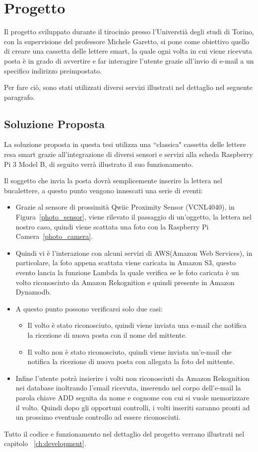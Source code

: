 \chapter{Progetto}
\label{ch:job_motivation}
Il progetto sviluppato durante il tirocinio presso l'Universtià degli studi di Torino, con la supervisione del professore Michele Garetto, si pone come obiettivo 
quello di creare una cassetta delle lettere smart, la quale ogni volta in cui viene ricevuta posta è in grado di avvertire e far interagire l'utente 
grazie all'invio di e-mail a un specifico indirizzo preimpostato.

Per fare ciò, sono stati utilizzati diversi servizi illustrati nel dettaglio nel seguente paragrafo.


\section{Soluzione Proposta}
\label{sec:solution}
La soluzione proposta in questa tesi utilizza una ``classica" cassetta delle lettere resa smart grazie all'integrazione di diversi sensori e servizi alla scheda 
Raspberry Pi 3 Model B, di seguito verrà illustrato il suo funzionamento.

Il soggetto che invia la posta dovrà semplicemente inserire la lettera nel bucalettere, a questo punto vengono innescati una serie di eventi:
\begin{itemize}
    \item Grazie al sensore di prossimità Qwiic Proximity Sensor (VCNL4040), in Figura~\ref{photo_sensor}, viene rilevato il passaggio di un'oggetto, la lettera nel 
    nostro caso, quindi viene scattata una foto con la Raspberry Pi Camera~\ref{photo_camera}.
    \item Quindi vi è l'interazione con alcuni servizi di AWS(Amazon Web Services), in particolare, la foto appena scattata viene caricata in Amazon S3, questo evento
    lancia la funzione Lambda la quale verifica se le foto caricata è un volto riconosciuto da Amazon Rekognition e quindi presente in Amazon Dynamodb.
    \item A questo punto possono verificarsi solo due casi:
    \begin{itemize}
        \item Il volto è stato riconosciuto, quindi viene inviata una e-mail che notifica la ricezione di nuova posta con il nome del mittente.
        \item Il volto non è stato riconosciuto, quindi viene inviata un'e-mail che notifica la ricezione di nuova posta con allegata
        la foto del mittente.
    \end{itemize}
    \item Infine l'utente potrà insierire i volti non riconosciuti da Amazon Rekognition nei database inoltrando l'email ricevuta, inserendo nel corpo dell'e-mail 
    la parola chiave ADD seguita da nome e cognome con cui si vuole memorizzare il volto. Quindi dopo gli opportuni controlli, i volti inseriti saranno pronti 
    ad un prossimo eventuale controllo ad essere riconosciuti.
\end{itemize} 

Tutto il codice e funzionamento nel dettaglio del progetto verrano illustrati nel capitolo ~\ref{ch:development}.
